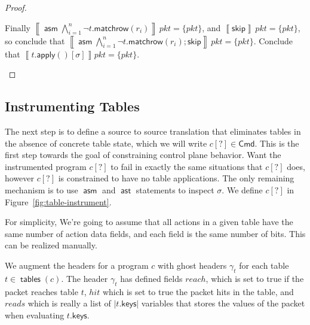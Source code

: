 \documentclass{article}
\newcommand{\pkt}{\mathit{pkt}}
\newcommand{\denote}[1]{\left\llbracket#1\right\rrbracket}
\newcommand{\Cmd}{\mathsf{Cmd}}
\newcommand{\keys}{\mathsf{keys}}
\newcommand{\reach}{\mathit{\mathit{reach}}}
\newcommand{\hit}{\mathit{hit}}
\newcommand{\reads}{\mathit{reads}}
\newcommand{\assert}{\mathop{\mathsf{ast}}}
\newcommand{\assume}{\mathop{\mathsf{asm}}}
\newcommand{\apply}{\mathsf{apply}}
\newcommand{\SKIP}{\mathsf{skip}}
\newcommand{\instr}{[?]}
\newcommand{\matchrow}{\mathsf{matchrow}}
\newcommand{\tables}{\mathop{\mathsf{tables}}}
\begin{document}
\begin{proof}
\begin{enumerate}[align=left]
\begin{enumerate}
          Finally $\denote{\assume \bigwedge_{i=1}^n \neg
            t.\matchrow(r_i)}\,\pkt = \{\pkt\}$, and $\denote{\SKIP}\,\pkt
          =\{\pkt\}$, so conclude that $\denote{\assume \bigwedge_{i=1}^n \neg
            t.\matchrow(r_i);\SKIP}\,\pkt = \{\pkt\}$.
          Conclude that $\denote{t.\apply()[\sigma]}\pkt = \{pkt\}$.
      \end{enumerate}
  \end{enumerate}
\end{proof}




\subsection{Instrumenting Tables}

The next step is to define a source to source translation that eliminates tables
in the absence of concrete table state, which we will write $c\instr \in \Cmd$.
This is the first step towards the goal of constraining control plane behavior.
Want the instrumented program $c\instr$ to fail in exactly the same situations that
$c\instr$ does, however $c\instr$ is constrained to have no table applications.
The only remaining mechanism is to use $\assume$ and $\assert$ statements to
inspect $\sigma$. We define $c[?]$ in Figure~\ref{fig:table-instrument}.

For simplicity, We're going to assume that all actions in a given table have the
same number of action data fields, and each field is the same number of bits.
This can be realized manually.

We augment the headers for a program $c$ with ghost headers $\gamma_t$ for each
table $t \in \tables(c)$. The header $\gamma_t$ has defined fields
$\reach$, which is set to true if the packet reaches table $t$,
$\hit$ which is set to true the packet hits in the table, and
$\reads$ which is really a list of $|t.\keys|$ variables that stores the
values of the packet when evaluating $t.\keys$.
\end{document}
